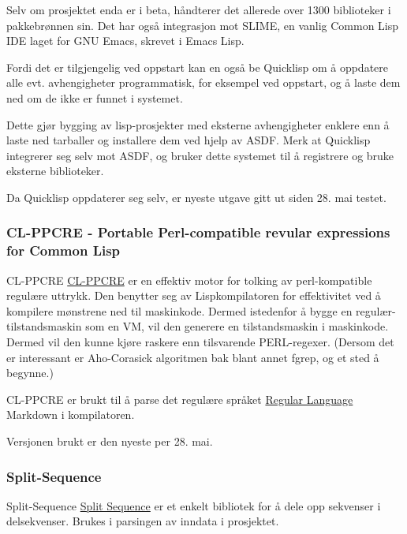 \documentclass[norsk, 11pt, a4paper]{article}
\begin{document}
Selv om prosjektet enda er i beta, håndterer det allerede over 1300 biblioteker i pakkebrønnen sin.
Det har også integrasjon mot SLIME, en vanlig Common Lisp IDE laget for GNU Emacs, skrevet i Emacs Lisp.



Fordi det er tilgjengelig ved oppstart kan en også be Quicklisp om å oppdatere alle evt. avhengigheter programmatisk, for eksempel ved oppstart, og å laste dem ned om de ikke er funnet i systemet.



Dette gjør bygging av lisp-prosjekter med eksterne avhengigheter enklere enn å laste ned tarballer og installere dem ved hjelp av ASDF. Merk at Quicklisp integrerer seg selv mot ASDF, og bruker dette systemet til å registrere og bruke eksterne biblioteker.



Da Quicklisp oppdaterer seg selv, er nyeste utgave gitt ut siden 28. mai testet.



\subsubsection{CL-PPCRE - Portable Perl-compatible revular expressions for Common Lisp}



CL-PPCRE \href{http://weitz.de/cl-ppcre/}{CL-PPCRE} er en effektiv motor for tolking av perl-kompatible regulære uttrykk. Den benytter seg av Lispkompilatoren for effektivitet ved å kompilere mønstrene ned til maskinkode. Dermed istedenfor å bygge en regulær-tilstandsmaskin som en VM, vil den generere en tilstandsmaskin i maskinkode. Dermed vil den kunne kjøre raskere enn tilsvarende PERL-regexer. (Dersom det er interessant er Aho-Corasick algoritmen bak blant annet fgrep, og et sted å begynne.)



CL-PPCRE er brukt til å parse det regulære språket \href{http://en.wikipedia.org/wiki/Regular)language}{Regular Language} Markdown i kompilatoren.



Versjonen brukt er den nyeste per 28. mai.



\subsubsection{Split-Sequence}
Split-Sequence \href{http://www.cliki.net/split-sequence}{Split Sequence} er et enkelt bibliotek for å dele opp sekvenser i delsekvenser.
Brukes i parsingen av inndata i prosjektet.
\end{document}
